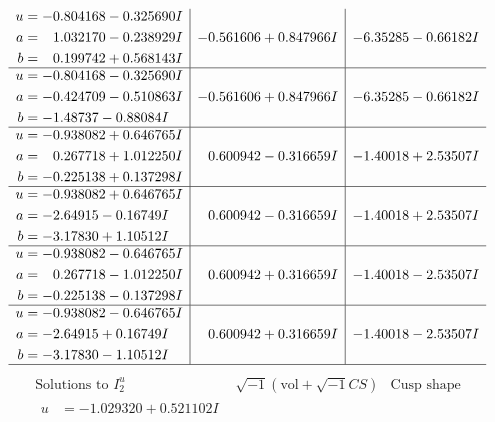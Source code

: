 \documentclass[1p]{elsarticle_modified}
\theoremstyle{definition}
\newcommand{\I}{\sqrt{-1}}
\begin{document}
$$\begin{array}{c|c|c}
\begin{aligned}
u &= -0.804168 - 0.325690 I \\
a &= \phantom{-}1.032170 - 0.238929 I \\
b &= \phantom{-}0.199742 + 0.568143 I\end{aligned}
 & -0.561606 + 0.847966 I & -6.35285 - 0.66182 I \\ \hline\begin{aligned}
u &= -0.804168 - 0.325690 I \\
a &= -0.424709 - 0.510863 I \\
b &= -1.48737 - 0.88084 I\end{aligned}
 & -0.561606 + 0.847966 I & -6.35285 - 0.66182 I \\ \hline\begin{aligned}
u &= -0.938082 + 0.646765 I \\
a &= \phantom{-}0.267718 + 1.012250 I \\
b &= -0.225138 + 0.137298 I\end{aligned}
 & \phantom{-}0.600942 - 0.316659 I & -1.40018 + 2.53507 I \\ \hline\begin{aligned}
u &= -0.938082 + 0.646765 I \\
a &= -2.64915 - 0.16749 I \\
b &= -3.17830 + 1.10512 I\end{aligned}
 & \phantom{-}0.600942 - 0.316659 I & -1.40018 + 2.53507 I \\ \hline\begin{aligned}
u &= -0.938082 - 0.646765 I \\
a &= \phantom{-}0.267718 - 1.012250 I \\
b &= -0.225138 - 0.137298 I\end{aligned}
 & \phantom{-}0.600942 + 0.316659 I & -1.40018 - 2.53507 I \\ \hline\begin{aligned}
u &= -0.938082 - 0.646765 I \\
a &= -2.64915 + 0.16749 I \\
b &= -3.17830 - 1.10512 I\end{aligned}
 & \phantom{-}0.600942 + 0.316659 I & -1.40018 - 2.53507 I\\
 \hline 
 \end{array}$$\newpage$$\begin{array}{c|c|c}  
\text{Solutions to }I^u_{2}& \I (\text{vol} + \sqrt{-1}CS) & \text{Cusp shape}\\
 \hline 
\begin{aligned}
u &= -1.029320 + 0.521102 I \\

\end{aligned}
\end{array}$$
\end{document}
